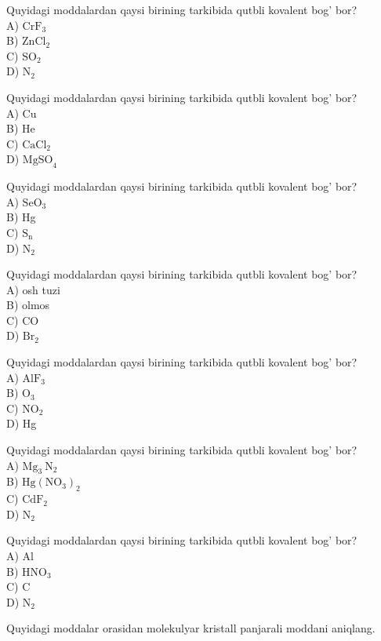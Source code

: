   \item Quyidagi moddalardan qaysi birining tarkibida qutbli kovalent bog' bor?\\
A) $\mathrm{CrF}_{3}$\\
B) $\mathrm{ZnCl}_{2}$\\
C) $\mathrm{SO}_{2}$\\
D) $\mathrm{N}_{2}$
  \item Quyidagi moddalardan qaysi birining tarkibida qutbli kovalent bog' bor?\\
A) Cu\\
B) He\\
C) $\mathrm{CaCl}_{2}$\\
D) $\mathrm{MgSO}_{4}$
  \item Quyidagi moddalardan qaysi birining tarkibida qutbli kovalent bog' bor?\\
A) $\mathrm{SeO}_{3}$\\
B) Hg\\
C) $\mathrm{S}_{\mathrm{n}}$\\
D) $\mathrm{N}_{2}$
  \item Quyidagi moddalardan qaysi birining tarkibida qutbli kovalent bog' bor?\\
A) osh tuzi\\
B) olmos\\
C) CO\\
D) $\mathrm{Br}_{2}$
  \item Quyidagi moddalardan qaysi birining tarkibida qutbli kovalent bog' bor?\\
A) $\mathrm{AlF}_{3}$\\
B) $\mathrm{O}_{3}$\\
C) $\mathrm{NO}_{2}$\\
D) Hg
  \item Quyidagi moddalardan qaysi birining tarkibida qutbli kovalent bog' bor?\\
A) $\mathrm{Mg}_{3} \mathrm{~N}_{2}$\\
B) $\mathrm{Hg}\left(\mathrm{NO}_{3}\right)_{2}$\\
C) $\mathrm{CdF}_{2}$\\
D) $\mathrm{N}_{2}$
  \item Quyidagi moddalardan qaysi birining tarkibida qutbli kovalent bog' bor?\\
A) Al\\
B) $\mathrm{HNO}_{3}$\\
C) C\\
D) $\mathrm{N}_{2}$
  \item Quyidagi moddalar orasidan molekulyar kristall panjarali moddani aniqlang.\\
